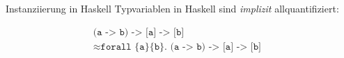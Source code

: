 \documentclass{beamer}
\begin{document}
\begin{frame}{Instanziierung in Haskell}
  Typvariablen in Haskell sind \emph{implizit} allquantifiziert:

  \begin{align*}
    \texttt{(a -> b) -> [a] -> [b]} & \\
    \approx \texttt{forall \{a\} \{b\}. (a -> b) -> [a] -> [b]} &
  \end{align*}


\end{frame}
\end{document}
